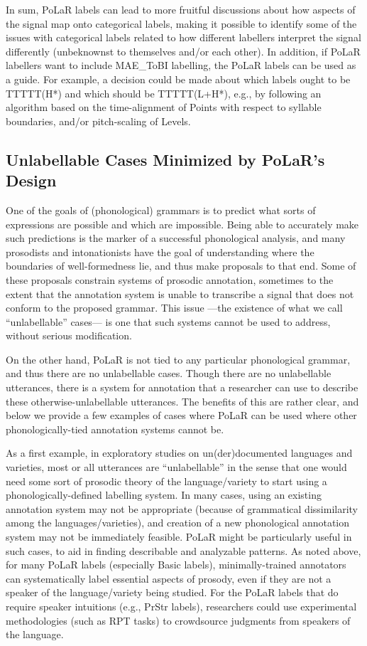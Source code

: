 \documentclass[11pt, twoside]{memoir}
\begin{document}
In sum, PoLaR labels can lead to more fruitful discussions about how aspects of the signal map onto categorical labels, making it possible to identify some of the issues with categorical labels related to how different labellers interpret the signal differently (unbeknownst to themselves and/or each other). In addition, if PoLaR labellers want to include MAE\_ToBI labelling, the PoLaR labels can be used as a guide.  For example, a decision could be made about which labels ought to be TTTTT(H*) and which should be TTTTT(L+H*), e.g., by following an algorithm based on the time-alignment of Points with respect to syllable boundaries, and/or pitch-scaling of Levels.


\subsection{Unlabellable Cases Minimized by PoLaR’s Design}\label{sec:difficultunlabellable-cases}
One of the goals of (phonological) grammars is to predict what sorts of expressions are possible and which are impossible. Being able to accurately make such predictions is the marker of a successful phonological analysis, and many prosodists and intonationists have the goal of understanding where the boundaries of well-formedness lie, and thus make proposals to that end. Some of these proposals constrain systems of prosodic annotation, sometimes to the extent that the annotation system is unable to transcribe a signal that does not conform to the proposed grammar. This issue —the existence of what we call “unlabellable” cases— is one that such systems cannot be used to address, without serious modification.

On the other hand, PoLaR is not tied to any particular phonological grammar, and thus there are no unlabellable cases. Though there are no unlabellable utterances, there is a system for annotation that a researcher can use to describe these otherwise-unlabellable utterances. The benefits of this are rather clear, and below we provide a few examples of cases where PoLaR can be used where other phonologically-tied annotation systems cannot be.

As a first example, in exploratory studies on un(der)documented languages and varieties, most or all utterances are “unlabellable” in the sense that one would need some sort of prosodic theory of the language\slash variety to start using a phonologically-defined labelling system. In many cases, using an existing annotation system may not be appropriate (because of grammatical dissimilarity among the languages\slash varieties), and creation of a new phonological annotation system may not be immediately feasible. PoLaR might be particularly useful in such cases, to aid in finding describable and analyzable patterns. As noted above, for many PoLaR labels (especially Basic labels), minimally-trained annotators can systematically label essential aspects of prosody, even if they are not a speaker of the language\slash variety being studied. For the PoLaR labels that do require speaker intuitions (e.g., PrStr labels), researchers could use experimental methodologies (such as RPT tasks) to crowdsource judgments from speakers of the language.
\end{document}
